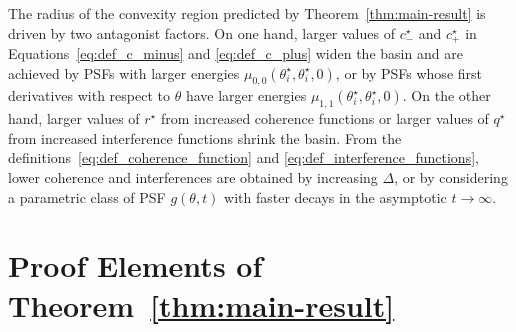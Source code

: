 \documentclass[conference,english,final,svgnames]{IEEEtran}
\begin{document}
The radius of the convexity region predicted by Theorem~\ref{thm:main-result} is driven by two antagonist factors.
On one hand, larger values of $c^\star_-$ and $c^\star_+$ in Equations~\eqref{eq:def_c_minus} and \eqref{eq:def_c_plus} widen the basin and are achieved by PSFs with larger energies $\mu_{0,0} (\theta_i^\star, \theta_i^\star, 0)$, or by PSFs whose first derivatives with respect to $\theta$ have larger energies $\mu_{1,1} (\theta_i^\star, \theta_i^\star, 0)$.
On the other hand, larger values of $r^\star$ from increased coherence functions or larger values of $q^\star$ from increased interference functions shrink the basin. From the definitions~\eqref{eq:def_coherence_function} and \eqref{eq:def_interference_functions}, lower coherence and interferences are obtained by increasing $\Delta$, or by considering a parametric class of PSF $g(\theta, t)$ with faster decays in the asymptotic $t\to \infty$.
 
\section{Proof Elements of Theorem~\ref{thm:main-result}}\label{sec:proof}
\end{document}
